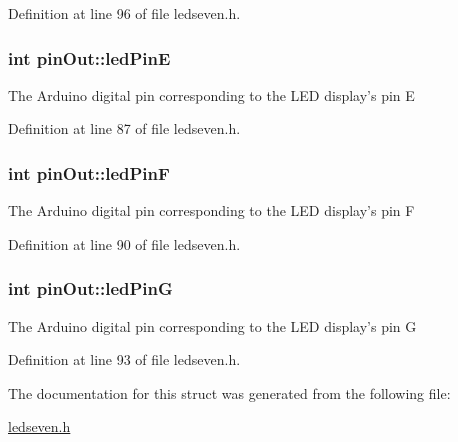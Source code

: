 Definition at line 96 of file ledseven.\+h.

\hypertarget{structpin_out_a34d7db1c42f58d60de9e5f0e10a740a2}{
\subsubsection[{led\+Pin\+E}]{\setlength{\rightskip}{0pt plus 5cm}int pin\+Out\+::led\+Pin\+E}}\label{structpin_out_a34d7db1c42f58d60de9e5f0e10a740a2}
The Arduino digital pin corresponding to the L\+E\+D display's pin E 

Definition at line 87 of file ledseven.\+h.

\hypertarget{structpin_out_a56e435d512b1ef24ca847884487314b6}{
\subsubsection[{led\+Pin\+F}]{\setlength{\rightskip}{0pt plus 5cm}int pin\+Out\+::led\+Pin\+F}}\label{structpin_out_a56e435d512b1ef24ca847884487314b6}
The Arduino digital pin corresponding to the L\+E\+D display's pin F 

Definition at line 90 of file ledseven.\+h.

\hypertarget{structpin_out_a34bb874b0fc3ef1cf5e6956a317d18ef}{
\subsubsection[{led\+Pin\+G}]{\setlength{\rightskip}{0pt plus 5cm}int pin\+Out\+::led\+Pin\+G}}\label{structpin_out_a34bb874b0fc3ef1cf5e6956a317d18ef}
The Arduino digital pin corresponding to the L\+E\+D display's pin G 

Definition at line 93 of file ledseven.\+h.



The documentation for this struct was generated from the following file\+:\begin{DoxyCompactItemize}
\item 
\hyperlink{ledseven_8h}{ledseven.\+h}\end{DoxyCompactItemize}
